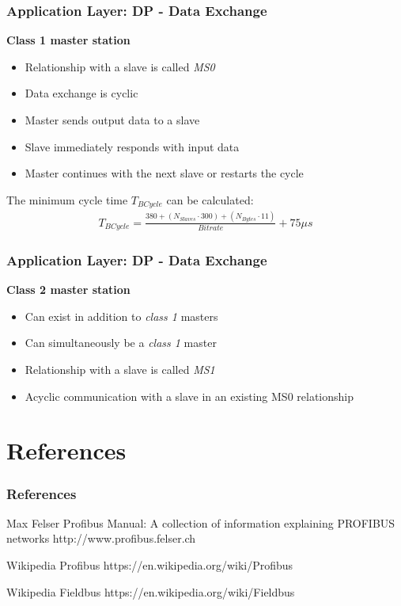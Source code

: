 \documentclass{beamer}
\begin{document}
\begin{frame}
  \frametitle{Application Layer: DP - Data Exchange}
  \textbf{Class 1 master station}
  \begin{itemize}
    \item Relationship with a slave is called \textit{MS0}
    \item Data exchange is cyclic
    \item Master sends output data to a slave
    \item Slave immediately responds with input data
    \item Master continues with the next slave or restarts the cycle
  \end{itemize}
  \vspace{10pt}
  The minimum cycle time $T_{BCycle}$ can be calculated:
  \begin{align*}
    T_{BCycle} = \frac{380 + (N_{Slaves} \cdot 300) + (N_{Bytes} \cdot 11)}{Bitrate} + 75
    \mu s
    \label{minimumcycletime}
  \end{align*}
\end{frame}

\begin{frame}
  \frametitle{Application Layer: DP - Data Exchange}
  \textbf{Class 2 master station}
  \begin{itemize}
    \item Can exist in addition to \textit{class 1} masters
    \item Can simultaneously be a \textit{class 1} master
    \item Relationship with a slave is called \textit{MS1}
    \item Acyclic communication with a slave in an existing MS0 relationship
  \end{itemize}
\end{frame}

\section*{References}
\begin{frame}[allowframebreaks]
  \frametitle{References}
  \begin{thebibliography}{10}
  \beamertemplatebookbibitems
    Max Felser
    \newblock Profibus Manual: A collection of information explaining PROFIBUS networks
    \newblock http://www.profibus.felser.ch

    Wikipedia
    \newblock Profibus
    \newblock https://en.wikipedia.org/wiki/Profibus

    Wikipedia
    \newblock Fieldbus
    \newblock https://en.wikipedia.org/wiki/Fieldbus
   \end{thebibliography}
 \end{frame}
\end{document}
